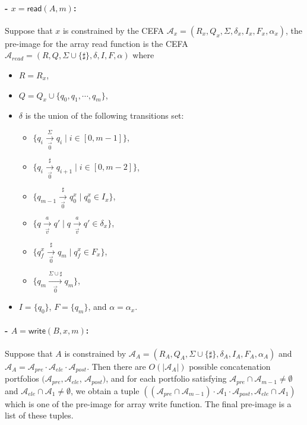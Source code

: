 \documentclass[12pt]{article}
\newcommand*{\aut}{\mathcal{A}}
\newcommand*{\myvec}[1]{\vec{#1}}
\newcommand{\arrseparator}{\sharp}
\newcommand{\myread}{\mathsf{read}}
\newcommand{\mywrite}{\mathsf{write}}
\newcommand{\myset}[1]{\{#1\}}
\theoremstyle{remark}
\begin{document}
\paragraph{- $x = \myread(A, m)$:} Suppose that $x$ is constrained by the CEFA $\aut_x=(R_x, Q_x, \Sigma, \delta_x, I_x, F_x, \alpha_x)$, the pre-image for the array read function is the CEFA $\aut_{read}=(R, Q, \Sigma\cup\{\arrseparator\}, \delta, I, F, \alpha)$ where
\begin{itemize}
    \item $R = R_x$,
    \item $Q = Q_x\cup\myset{q_0, q_1, \cdots, q_{m}}$,
    \item $\delta$ is the union of the following transitions set:
          \begin{itemize}
              \item $\myset{q_i\xrightarrow[\myvec{0}]{\Sigma}q_i\mid i\in [0, m-1]}$,
              \item $\myset{q_i\xrightarrow[\myvec{0}]{\arrseparator}q_{i+1}\mid i\in[0,m-2]}$,
              \item $\myset{q_{m-1}\xrightarrow[\myvec{0}]{\arrseparator}q_0^x \mid q_0^x\in I_x}$,
              \item $\myset{q\xrightarrow[\myvec{v}]{a}q'\mid q\xrightarrow[\myvec{v}]{a}q'\in \delta_x}$,
              \item $\myset{q_f^x\xrightarrow[\myvec{0}]{\arrseparator}q_m \mid q_f^x\in F_x}$,
              \item $\myset{q_m\xrightarrow[\myvec{0}]{\Sigma\cup\arrseparator} q_m}$,
          \end{itemize}
    \item $I = \myset{q_0}$, $F = \myset{q_m}$, and $\alpha = \alpha_x$.
\end{itemize}

\paragraph{- $A = \mywrite(B, x, m)$:} Suppose that $A$ is constrained by $\aut_A=(R_A, Q_A, \Sigma\cup\{\arrseparator\}, \delta_A, I_A, F_A, \alpha_A)$ and $\aut_A = \aut_{pre}\cdot\aut_{ele}\cdot\aut_{post}$. Then there are $O(|\aut_A|)$ possible concatenation portfolios $(\aut_{pre},\aut_{ele}$, $\aut_{post})$, and for each portfolio satisfying $\aut_{pre}\cap\aut_{m-1}\not=\emptyset$ and $\aut_{ele}\cap\aut_1\not=\emptyset$, we obtain a tuple $((\aut_{pre}\cap\aut_{m-1})\cdot\aut_1\cdot\aut_{post}, \aut_{ele}\cap\aut_1)$ which is one of the pre-image for array write function. The final pre-image is a list of these tuples.
\end{document}
